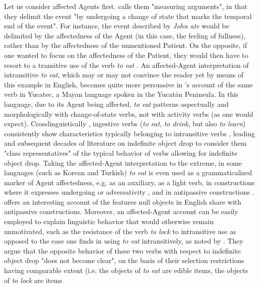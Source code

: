 Let us consider affected Agents first. \textcite[158]{tenny1994aspectual} calls them "measuring arguments", in that they delimit the event "by undergoing a change of state that marks the temporal end of the event". For instance, the event described by \textit{John ate} would be delimited by the affectedness of the Agent (in this case, the feeling of fullness), rather than by the affectedness of the unmentioned Patient. On the opposite, if one wanted to focus on the affectedness of the Patient, they would then have to resort to a transitive use of the verb \textit{to eat} \parencite[80]{Naess2007}. An affected-Agent interpretation of intransitive \textit{to eat}, which may or may not convince the reader yet by means of this example in English, becomes quite more persuasive in \textcite[61-63]{Naess2007}'s account of the same verb in Yucatec, a Mayan language spoken in the Yucatán Peninsula. In this language, due to its Agent being affected, \textit{to eat} patterns aspectually and morphologically with change-of-state verbs, not with activity verbs (as one would expect). Crosslinguistically \parencite[126]{Naess2007}, ingestive verbs (\textit{to eat}, \textit{to drink}, but also \textit{to learn}) consistently show characteristics typically belonging to intransitive verbs \parencite{Amberber2009}, leading \textcite{marantz1981nature} and subsequent decades of literature on indefinite object drop to consider them "class representatives" of the typical behavior of verbs allowing for indefinite object drop. Taking the affected-Agent interpretation to the extreme, in some languages (such as Korean and Turkish) \textit{to eat} is even used as a grammaticalized marker of Agent affectedness, e.g. as an auxiliary, as a light verb, in constructions where it expresses undergoing or adversativity \parencite[75]{Naess2007}, and in antipassive constructions \parencite[414]{Naess2011}.  \textcite{Nicolas2019} offers an interesting account of the features null objects in English share with antipassive constructions. Moreover, an affected-Agent account can be easily employed to explain linguistic behavior that would otherwise remain unmotivated, such as the resistance of the verb \textit{to lock} to intransitive use as opposed to the ease one finds in using \textit{to eat} intransitively, as noted by \textcite[30]{PethoKardos2006}. They argue that the opposite behavior of these two verbs with respect to indefinite object drop "does not become clear", on the basis of their selection restrictions having comparable extent (i.e. the objects of \textit{to eat} are edible items, the objects of \textit{to lock} are items 